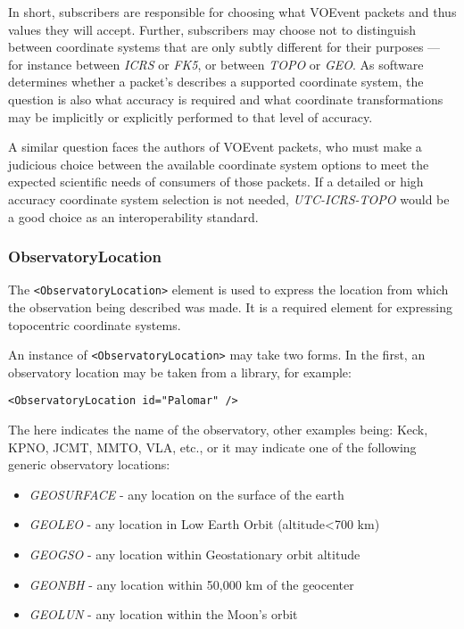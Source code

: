 \documentclass[11pt,a4paper]{ivoa}
\begin{document}
In short, subscribers are responsible for choosing what VOEvent packets and thus
 values they will accept. Further, subscribers may choose
not to distinguish between coordinate systems that are only subtly different for
their purposes --- for instance between \emph{ICRS} or \emph{FK5}, or between
\emph{TOPO} or \emph{GEO}. As software determines whether a packet's
 describes a supported coordinate system, the question is also
what accuracy is required and what coordinate transformations may be implicitly
or explicitly performed to that level of accuracy.

A similar question faces the authors of VOEvent packets, who must make a
judicious choice between the available coordinate system options to meet the
expected scientific needs of consumers of those packets. If a detailed or high
accuracy coordinate system selection is not needed, \emph{UTC-ICRS-TOPO}
would be a good choice as an interoperability standard.

\subsubsection{ObservatoryLocation}
\label{sec:3.4.2}
The \verb|<ObservatoryLocation>| element is used to express the location from
which the observation being described was made. It is a required element for
expressing topocentric coordinate systems.

An instance of \verb|<ObservatoryLocation>| may take two forms. In the first,
an observatory location may be taken from a library, for example:
\begin{lstlisting}
<ObservatoryLocation id="Palomar" />
\end{lstlisting}

The  here indicates the name of the observatory, other examples being:
Keck, KPNO, JCMT, MMTO, VLA, etc., or it may indicate one of the following
generic observatory locations:
\begin{itemize}
\item \emph{GEOSURFACE} - any location on the surface of the earth
\item \emph{GEOLEO} - any location in Low Earth Orbit (altitude<700 km)
\item \emph{GEOGSO} - any location within Geostationary orbit altitude
\item \emph{GEONBH} - any location within 50,000 km of the geocenter
\item \emph{GEOLUN} - any location within the Moon's orbit
\end{itemize}
\end{document}
